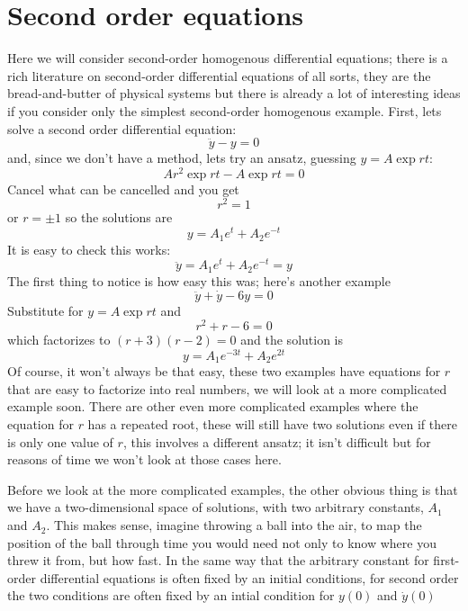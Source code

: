 \documentclass[12pt]{article}
\begin{document}
\section*{Second order equations}

Here we will consider second-order homogenous differential equations;
there is a rich literature on second-order differential equations of
all sorts, they are the bread-and-butter of physical systems but there
is already a lot of interesting ideas if you consider only the
simplest second-order homogenous example. First, lets solve a second order differential equation:
\begin{equation}
  \ddot{y}-y=0
\end{equation}
and, since we don't have a method, lets try an ansatz, guessing $y=A\exp{rt}$:
\begin{equation}
  Ar^2\exp{rt}-A\exp{rt}=0
\end{equation}
Cancel what can be cancelled and you get
\begin{equation}
  r^2=1
\end{equation}
or $r=\pm 1$ so the solutions are
\begin{equation}
  y=A_1e^t+A_2e^{-t}
\end{equation}
It is easy to check this works:
\begin{equation}
  \ddot{y}=A_1e^{t}+A_2e^{-t}=y
\end{equation}
The first thing to notice is how easy this was; here's another example
\begin{equation}
  \ddot{y}+\dot{y}-6y=0
\end{equation}
Substitute for $y=A\exp{rt}$ and
\begin{equation}
  r^2+r-6=0
\end{equation}
which factorizes to $(r+3)(r-2)=0$ and the solution is
\begin{equation}
  y=A_1e^{-3t}+A_2e^{2t}
\end{equation}
Of course, it won't always be that easy, these two examples have
equations for $r$ that are easy to factorize into real numbers, we
will look at a more complicated example soon. There are other even
more complicated examples where the equation for $r$ has a repeated
root, these will still have two solutions even if there is only one
value of $r$, this involves a different ansatz; it isn't difficult but
for reasons of time we won't look at those cases here.

Before we look at the more complicated examples, the other obvious
thing is that we have a two-dimensional space of solutions, with two
arbitrary constants, $A_1$ and $A_2$. This makes sense, imagine
throwing a ball into the air, to map the position of the ball through
time you would need not only to know where you threw it from, but how
fast. In the same way that the arbitrary constant for first-order
differential equations is often fixed by an initial conditions, for
second order the two conditions are often fixed by an intial condition
for $y(0)$ and $\dot{y}(0)$
\end{document}
